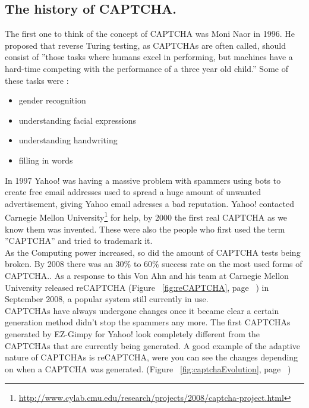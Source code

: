 \documentclass[pdftex,a4paper,12pt,twoside]{report}
\begin{document}
\subsection{The history of CAPTCHA.}
The first one to think of the concept of CAPTCHA was Moni Naor in 1996. He proposed that reverse Turing testing, as CAPTCHAs are often called, should consist of ''those tasks 
where humans excel in performing, but machines have a hard-time competing with the 
performance of a three year old child.'' Some of these tasks were \citep{Naor1996}:
\begin{itemize}
\item gender recognition
\item understanding facial expressions
\item understanding handwriting
\item filling in words
\end{itemize}
In 1997 Yahoo! was having a massive problem with spammers using bots to create free email addresses used to spread a huge amount of unwanted advertisement, giving Yahoo email adresses a bad reputation. Yahoo! contacted Carnegie Mellon University\footnote{\url{http://www.cylab.cmu.edu/research/projects/2008/captcha-project.html}} for help, by 2000 the first real CAPTCHA as we know them was invented\citep{Egen2009}. These were also the people who first used the term ''CAPTCHA'' and tried to trademark it.\\As the Computing power increased, so did the amount of CAPTCHA tests being broken. By 2008 there was an 30\% to 60\% success rate on the most used forms of CAPTCHA.\citep{Yan2008}. As a  response to this Von Ahn and his team at Carnegie Mellon University released reCAPTCHA (Figure ~\ref{fig:reCAPTCHA}, page ~\pageref{fig:reCAPTCHA}) in September 2008, a popular system still currently in use.\\CAPTCHAs have always undergone changes once it became clear a certain generation method didn't stop the spammers any more. The first CAPTCHAs generated by EZ-Gimpy for Yahoo! look completely different from the CAPTCHAs that are currently being generated. A good example of the adaptive nature of CAPTCHAs is reCAPTCHA, were you can see the changes depending on when a CAPTCHA was generated. (Figure ~\ref{fig:captchaEvolution}, page ~\pageref{fig:captchaEvolution})
\end{document}
